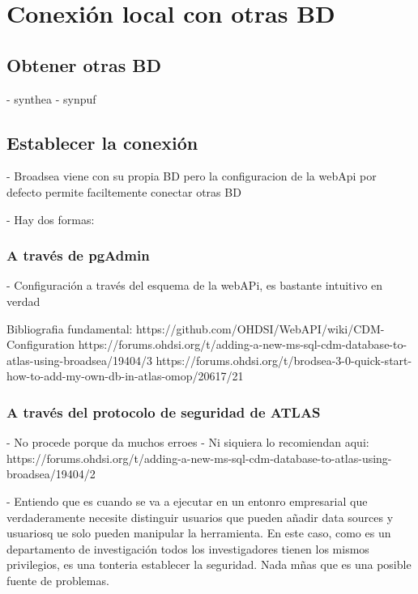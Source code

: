 \chapter{Conexión local con otras BD}

\section{Obtener otras BD}

- synthea
- synpuf


\section{Establecer la conexión}

- Broadsea viene con su propia BD pero la configuracion de la webApi por defecto permite faciltemente conectar otras BD

- Hay dos formas:

\subsection{A través de pgAdmin}

- Configuración a través del esquema de la webAPi, es bastante intuitivo en verdad

Bibliografia fundamental: https://github.com/OHDSI/WebAPI/wiki/CDM-Configuration
https://forums.ohdsi.org/t/adding-a-new-ms-sql-cdm-database-to-atlas-using-broadsea/19404/3
https://forums.ohdsi.org/t/brodsea-3-0-quick-start-how-to-add-my-own-db-in-atlas-omop/20617/21

\subsection{A través del protocolo de seguridad de ATLAS}

- No procede porque da muchos erroes
- Ni siquiera lo recomiendan aqui: https://forums.ohdsi.org/t/adding-a-new-ms-sql-cdm-database-to-atlas-using-broadsea/19404/2 

- Entiendo que es cuando se va a ejecutar en un entonro empresarial que verdaderamente necesite distinguir usuarios que pueden añadir data sources y usuariosq ue solo pueden manipular la herramienta. En este caso, como es un departamento de investigación todos los investigadores tienen los mismos privilegios, es una tonteria establecer la seguridad. Nada mñas que es una posible fuente de problemas.
